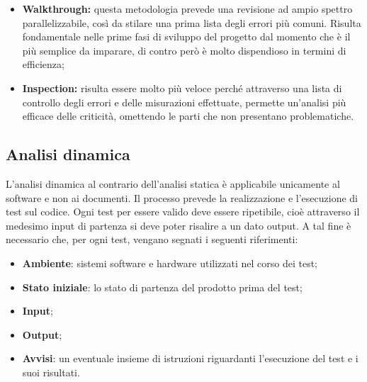 \begin{itemize}
\begin{itemize}
\item \textbf{Walkthrough:} questa metodologia prevede una revisione ad ampio
spettro parallelizzabile, così da stilare una prima lista degli errori più
comuni. Risulta fondamentale nelle prime fasi di sviluppo del progetto
dal momento che è il più semplice da imparare, di contro però è molto
dispendioso in termini di efficienza;

\item \textbf{Inspection:} risulta essere molto più veloce perché attraverso una lista di controllo degli
errori e delle misurazioni effettuate, permette un'analisi più efficace delle
criticità, omettendo le parti che non presentano problematiche.
\end{itemize}
	
\subsection{Analisi dinamica}	L'analisi dinamica al contrario dell'analisi statica è applicabile unicamente
al software e non ai documenti. Il processo prevede la realizzazione e l'esecuzione
di test sul codice. Ogni test per essere valido deve essere ripetibile,
cioè attraverso il medesimo input di partenza si deve poter risalire a un dato
output. A tal fine è necessario che, per ogni test, vengano segnati i seguenti
riferimenti:

\begin{itemize}
	\item \textbf{Ambiente}: sistemi software e hardware utilizzati nel corso dei
	test;
	\item \textbf{Stato iniziale}: lo stato di partenza del prodotto prima del test;
	\item \textbf{Input};
	\item \textbf{Output};
	\item \textbf{Avvisi}: un eventuale insieme di istruzioni riguardanti l'esecuzione del
test e i suoi risultati.

\end{itemize}


\end{itemize}

